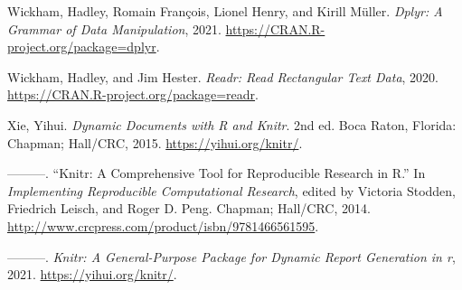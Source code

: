 \documentclass[
  12pt,
]{article}
\newlength{\cslhangindent}
\newenvironment{CSLReferences}[2] %
 {%
  \setlength{\parindent}{0pt}
  \ifodd #1 \everypar{\setlength{\hangindent}{\cslhangindent}}\ignorespaces\fi
  \ifnum #2 > 0
  \setlength{\parskip}{#2\baselineskip}
  \fi
 }%
 {}
\begin{document}
\begin{CSLReferences}{1}{0}
\leavevmode{}%
Wickham, Hadley, Romain François, Lionel Henry, and Kirill Müller.
\emph{Dplyr: A Grammar of Data Manipulation}, 2021.
\url{https://CRAN.R-project.org/package=dplyr}.

\leavevmode{}%
Wickham, Hadley, and Jim Hester. \emph{Readr: Read Rectangular Text
Data}, 2020. \url{https://CRAN.R-project.org/package=readr}.

\leavevmode{}%
Xie, Yihui. \emph{Dynamic Documents with {R} and Knitr}. 2nd ed. Boca
Raton, Florida: Chapman; Hall/CRC, 2015. \url{https://yihui.org/knitr/}.

\leavevmode{}%
---------. {``Knitr: A Comprehensive Tool for Reproducible Research in
{R}.''} In \emph{Implementing Reproducible Computational Research},
edited by Victoria Stodden, Friedrich Leisch, and Roger D. Peng.
Chapman; Hall/CRC, 2014.
\url{http://www.crcpress.com/product/isbn/9781466561595}.

\leavevmode{}%
---------. \emph{Knitr: A General-Purpose Package for Dynamic Report
Generation in r}, 2021. \url{https://yihui.org/knitr/}.

\end{CSLReferences}
\end{document}
